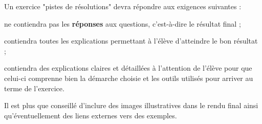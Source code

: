 Un exercice "pistes de résolutions" devra répondre aux exigences suivantes :
\item ne contiendra pas les \textbf{réponses} aux questions, c'est-à-dire le résultat final ;
\item contiendra toutes les explications permettant à l'élève d'atteindre le bon résultat ;
\item contiendra des explications claires et détaillées à l'attention de l'élève pour que celui-ci comprenne bien la démarche choisie et les outils utilisés pour arriver au terme de l'exercice.

Il est plus que conseillé d'inclure des images illustratives dans le rendu final ainsi qu'éventuellement des liens externes vers des exemples.